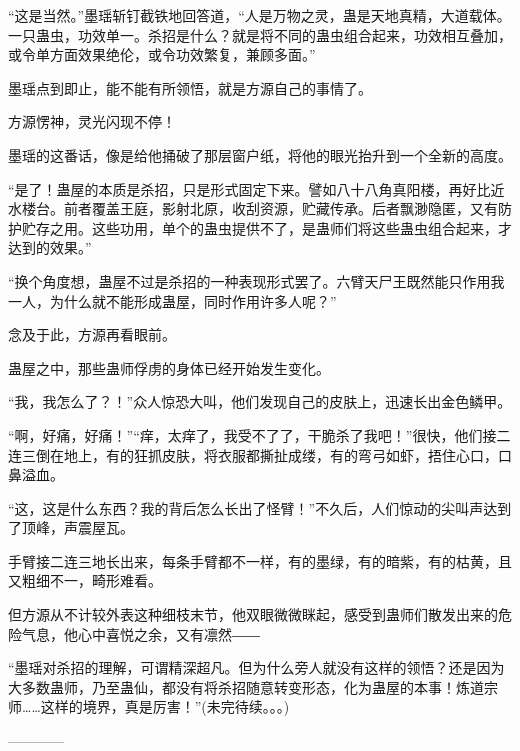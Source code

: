 \begin{this_body}
“这是当然。”墨瑶斩钉截铁地回答道，“人是万物之灵，蛊是天地真精，大道载体。一只蛊虫，功效单一。杀招是什么？就是将不同的蛊虫组合起来，功效相互叠加，或令单方面效果绝伦，或令功效繁复，兼顾多面。”

墨瑶点到即止，能不能有所领悟，就是方源自己的事情了。

方源愣神，灵光闪现不停！

墨瑶的这番话，像是给他捅破了那层窗户纸，将他的眼光抬升到一个全新的高度。

“是了！蛊屋的本质是杀招，只是形式固定下来。譬如八十八角真阳楼，再好比近水楼台。前者覆盖王庭，影射北原，收刮资源，贮藏传承。后者飘渺隐匿，又有防护贮存之用。这些功用，单个的蛊虫提供不了，是蛊师们将这些蛊虫组合起来，才达到的效果。”

“换个角度想，蛊屋不过是杀招的一种表现形式罢了。六臂天尸王既然能只作用我一人，为什么就不能形成蛊屋，同时作用许多人呢？”

念及于此，方源再看眼前。

蛊屋之中，那些蛊师俘虏的身体已经开始发生变化。

“我，我怎么了？！”众人惊恐大叫，他们发现自己的皮肤上，迅速长出金色鳞甲。

“啊，好痛，好痛！”“痒，太痒了，我受不了了，干脆杀了我吧！”很快，他们接二连三倒在地上，有的狂抓皮肤，将衣服都撕扯成缕，有的弯弓如虾，捂住心口，口鼻溢血。

“这，这是什么东西？我的背后怎么长出了怪臂！”不久后，人们惊动的尖叫声达到了顶峰，声震屋瓦。

手臂接二连三地长出来，每条手臂都不一样，有的墨绿，有的暗紫，有的枯黄，且又粗细不一，畸形难看。

但方源从不计较外表这种细枝末节，他双眼微微眯起，感受到蛊师们散发出来的危险气息，他心中喜悦之余，又有凛然――

“墨瑶对杀招的理解，可谓精深超凡。但为什么旁人就没有这样的领悟？还是因为大多数蛊师，乃至蛊仙，都没有将杀招随意转变形态，化为蛊屋的本事！炼道宗师……这样的境界，真是厉害！”(未完待续。。。)

------------

\end{this_body}

